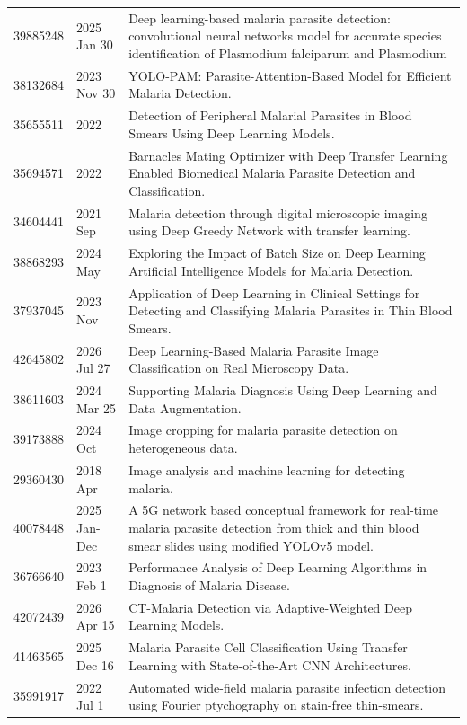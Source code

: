 \begin{longtable}{llp{9.5cm}}
39885248 & 2025 Jan 30 & Deep learning-based malaria parasite detection: convolutional neural networks model for accurate species identification of Plasmodium falciparum and Plasmodium  \\
38132684 & 2023 Nov 30 & YOLO-PAM: Parasite-Attention-Based Model for Efficient Malaria Detection. \\
35655511 & 2022 & Detection of Peripheral Malarial Parasites in Blood Smears Using Deep Learning Models. \\
35694571 & 2022 & Barnacles Mating Optimizer with Deep Transfer Learning Enabled Biomedical Malaria Parasite Detection and Classification. \\
34604441 & 2021 Sep & Malaria detection through digital microscopic imaging using Deep Greedy Network with transfer learning. \\
38868293 & 2024 May & Exploring the Impact of Batch Size on Deep Learning Artificial Intelligence Models for Malaria Detection. \\
37937045 & 2023 Nov & Application of Deep Learning in Clinical Settings for Detecting and Classifying Malaria Parasites in Thin Blood Smears. \\
42645802 & 2026 Jul 27 & Deep Learning-Based Malaria Parasite Image Classification on Real Microscopy Data. \\
38611603 & 2024 Mar 25 & Supporting Malaria Diagnosis Using Deep Learning and Data Augmentation. \\
39173888 & 2024 Oct & Image cropping for malaria parasite detection on heterogeneous data. \\
29360430 & 2018 Apr & Image analysis and machine learning for detecting malaria. \\
40078448 & 2025 Jan-Dec & A 5G network based conceptual framework for real-time malaria parasite detection from thick and thin blood smear slides using modified YOLOv5 model. \\
36766640 & 2023 Feb 1 & Performance Analysis of Deep Learning Algorithms in Diagnosis of Malaria Disease. \\
42072439 & 2026 Apr 15 & CT-Malaria Detection via Adaptive-Weighted Deep Learning Models. \\
41463565 & 2025 Dec 16 & Malaria Parasite Cell Classification Using Transfer Learning with State-of-the-Art CNN Architectures. \\
35991917 & 2022 Jul 1 & Automated wide-field malaria parasite infection detection using Fourier ptychography on stain-free thin-smears. \\

\end{longtable}
